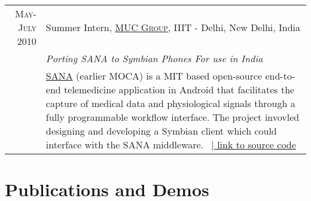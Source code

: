 \documentclass[a4paper,10pt]{article} %
\begin{document}
\begin{longtable}{r|p{13cm}}
\newpage

\textsc{May-July 2010} & Summer Intern, \href{http://muc.iiitd.edu.in/muc/}{\textsc{MUC Group}}, IIIT - Delhi, New Delhi, India \emph{}\\
\textsc{} & \emph{Porting SANA to Symbian Phones For use in India}\\ 
& \small{\href{http://sana.mit.edu}{SANA} (earlier MOCA) is a MIT based open-source end-to-end telemedicine application in Android that facilitates the capture of medical data and physiological signals through a fully programmable workflow interface. The project invovled designing and developing a Symbian client which could interface with the SANA middleware.} \ \href{https://code.google.com/p/moca/}{\hfill | link to source code}
\end{longtable}


\section{\color{red} Publications and Demos} %
\end{document}
